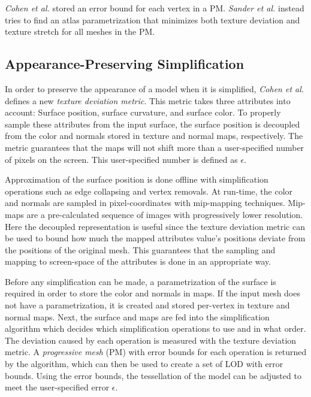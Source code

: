 \emph{Cohen et al.} \cite{cohen1998appearance} stored an error bound for each vertex in a PM. \emph{Sander et al.} \cite{sander2001texture} instead tries to find an atlas parametrization that minimizes both texture deviation and texture stretch for all meshes in the PM.


\subsection{Appearance-Preserving Simplification} \label{sec:appearance-preserving_simplification}
In order to preserve the appearance of a model when it is simplified, \emph{Cohen et al.} \cite{cohen1998appearance} defines a new \emph{texture deviation metric}. This metric takes three attributes into account: Surface position, surface curvature, and surface color. To properly sample these attributes from the input surface, the surface position is decoupled from the color and normals stored in texture and normal maps, respectively. The metric guarantees that the maps will not shift more than a user-specified number of pixels on the screen. This user-specified number is defined as $\epsilon$.

Approximation of the surface position is done offline with simplification operations such as edge collapsing and vertex removals. At run-time, the color and normals are sampled in pixel-coordinates with mip-mapping techniques. Mip-maps are a pre-calculated sequence of images with progressively lower resolution. Here the decoupled representation is useful since the texture deviation metric can be used to bound how much the mapped attributes value's positions deviate from the positions of the original mesh. This guarantees that the sampling and mapping to screen-space of the attributes is done in an appropriate way.

Before any simplification can be made, a parametrization of the surface is required in order to store the color and normals in maps. If the input mesh does not have a parametrization, it is created and stored per-vertex in texture and normal maps. Next, the surface and maps are fed into the simplification algorithm which decides which simplification operations to use and in what order. The deviation caused by each operation is measured with the texture deviation metric. A \emph{progressive mesh} (PM) with error bounds for each operation is returned by the algorithm, which can then be used to create a set of LOD with error bounds. Using the error bounds, the tessellation of the model can be adjusted to meet the user-specified error $\epsilon$.

